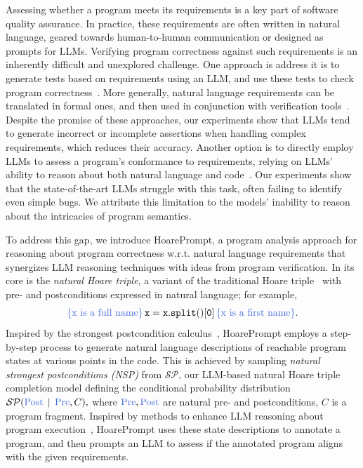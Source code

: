 \documentclass[sigconf]{acmart}
\makeatletter
\newcommand{\projName}{HoarePrompt\xspace}
\def\mathcolor#1#{\@mathcolor{#1}}
\def\@mathcolor#1#2#3{%
  \protect\leavevmode
  \begingroup
    \color#1{#2}#3%
  \endgroup
}
\makeatother
\begin{document}
Assessing whether a program meets its requirements is a key part of software quality assurance. In practice, these requirements are often written in natural language, geared towards human-to-human communication or designed as prompts for LLMs. Verifying program correctness against such requirements is an inherently difficult and unexplored challenge. One approach is address it is to generate tests based on requirements using an LLM, and use these tests to check program correctness~\cite{chen2022codet}. More generally, natural language requirements can be translated in formal ones, and then used in conjunction with verification tools~\cite{endres2024can}. Despite the promise of these approaches, our experiments show that LLMs tend to generate incorrect or incomplete assertions when handling complex requirements, which reduces their accuracy. Another option is to directly employ LLMs to assess a program's conformance to requirements, relying on LLMs' ability to reason about both natural language and code~\cite{liu2024codemind}. Our experiments show that the state-of-the-art LLMs struggle with this task, often failing to identify even simple bugs. We attribute this limitation to the models' inability to reason about the intricacies of program semantics.

To address this gap, we introduce \projName, a program analysis approach for reasoning about program correctness w.r.t. natural language requirements that synergizes LLM reasoning techniques with ideas from program verification. In its core is the \emph{natural Hoare triple}, a variant of the traditional Hoare triple~\cite{hoare1969axiomatic} with pre- and postconditions expressed in natural language; for example, $$\mathcolor{softblue}{\{ \text{x is a full name} \}} \,\mathtt{x = x.split()[0]}\, \mathcolor{softblue}{\{ \text{x is a first name} \}}.$$ Inspired by the strongest postcondition calculus~\cite{dijkstra1976discipline}, \projName employs a step-by-step process to generate natural language descriptions of reachable program states at various points in the code. This is achieved by sampling \emph{natural strongest postconditions (NSP)} from $\mathcal{SP}$, our LLM-based natural Hoare triple completion model defining the conditional probability distribution $\mathcal{SP}(\mathcolor{softblue}{\mathrm{Post}}\,\mid\,\mathcolor{softblue}{\mathrm{Pre}}, C),$
where $\mathcolor{softblue}{\mathrm{Pre}}, \mathcolor{softblue}{\mathrm{Post}}$ are natural pre- and postconditions, $C$ is a program fragment. Inspired by methods to enhance LLM reasoning about program execution~\cite{ni2024next}, \projName uses these state descriptions to annotate a program, and then prompts an LLM to assess if the annotated program aligns with the given requirements.
\end{document}
